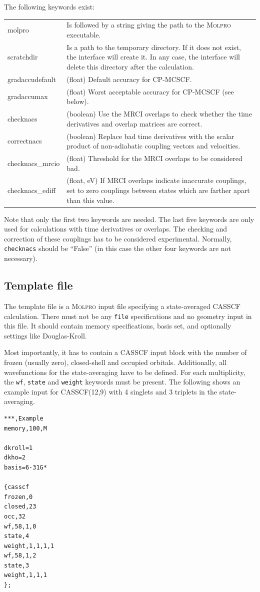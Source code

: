 \documentclass[a4paper,11pt,DIV=15,openany,twoside=false]{scrbook}
\newcommand{\ttt}[1]{\texttt{#1}}
\newenvironment{example}{
  \vspace{0mm}
  \definecolor{shadecolor}{HTML}{BBDDFF}
  \begin{shaded}
  \begin{minipage}{0.9\textwidth}
}{
  \end{minipage}
  \end{shaded}
}
\begin{document}
The following keywords exist:

\begin{tabular}{lp{9cm}}
molpro          &Is followed by a string giving the path to the \textsc{Molpro} executable.\\
scratchdir      &Is a path to the temporary directory. If it does not exist, the interface will create it. In any case, the interface will delete this directory after the calculation.\\
gradaccudefault &(float) Default accuracy for CP-MCSCF.\\
gradaccumax     &(float) Worst acceptable accuracy for CP-MCSCF (see below).\\
checknacs       &(boolean) Use the MRCI overlaps to check whether the time derivatives and overlap matrices are correct.\\
correctnacs     &(boolean) Replace bad time derivatives with the scalar product of non-adiabatic coupling vectors and velocities.\\
checknacs\_mrcio &(float) Threshold for the MRCI overlaps to be considered bad.\\
checknacs\_ediff &(float, eV) If MRCI overlaps indicate inaccurate couplings, set to zero couplings between states which are farther apart than this value.
\end{tabular}

Note that only the first two keywords are needed. The last five keywords are only used for calculations with time derivatives or overlaps. The checking and correction of these couplings has to be considered experimental. Normally, \ttt{checknacs} should be ``False'' (in this case the other four keywords are not necessary).

\subsection{Template file}

The template file is a \textsc{Molpro} input file specifying a state-averaged CASSCF calculation. There must not be any \ttt{file} specifications and no geometry input in this file. It should contain memory specifications, basis set, and optionally settings like Douglas-Kroll.

Most importantly, it has to contain a CASSCF input block with the number of frozen (usually zero), closed-shell and occupied orbitals. Additionally, all wavefunctions for the state-averaging have to be defined. For each multiplicity, the \ttt{wf}, \ttt{state} and \ttt{weight} keywords must be present. The following shows an example input for CASSCF(12,9) with 4 singlets and 3 triplets in the state-averaging.
\begin{example}
  \begin{verbatim}
***,Example
memory,100,M

dkroll=1
dkho=2
basis=6-31G*

{casscf
frozen,0
closed,23
occ,32
wf,58,1,0
state,4
weight,1,1,1,1
wf,58,1,2
state,3
weight,1,1,1
};
  \end{verbatim}
\end{example}
\end{document}
